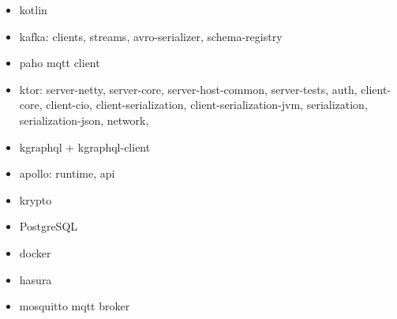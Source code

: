 \begin{itemize}


  \item kotlin

  \item kafka: clients, streams, avro-serializer, schema-registry

  \item paho mqtt client

  \item ktor: server-netty, server-core, server-host-common, server-tests, auth, client-core, client-cio, client-serialization, client-serialization-jvm, serialization, serialization-json, network, 


  \item kgraphql + kgraphql-client

  \item apollo: runtime, api

  \item krypto

  \item PostgreSQL

  \item docker

  \item hasura

  \item mosquitto mqtt broker


\end{itemize}


